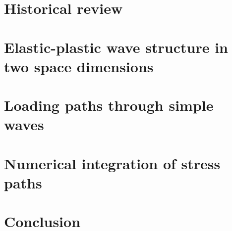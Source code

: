 \section{Historical review}
\label{sec:review}


\section{Elastic-plastic wave structure in two space dimensions}
\label{sec:charac_plast}


\section{Loading paths through simple waves}
\label{sec:stress_paths}



\section{Numerical integration of stress paths}
\label{sec:stress_paths_num}


\section*{Conclusion}
\label{sec:ep_Riemman_solver}

